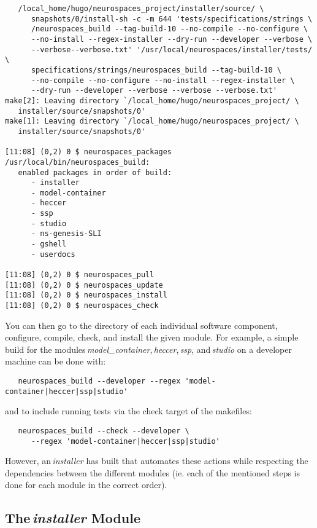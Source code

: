 \documentclass[12pt]{article}
\begin{document}
\begin{itemize}
\begin{enumerate}
\begin{verbatim}
   /local_home/hugo/neurospaces_project/installer/source/ \
      snapshots/0/install-sh -c -m 644 'tests/specifications/strings \
      /neurospaces_build --tag-build-10 --no-compile --no-configure \
      --no-install --regex-installer --dry-run --developer --verbose \
      --verbose--verbose.txt' '/usr/local/neurospaces/installer/tests/ \
      specifications/strings/neurospaces_build --tag-build-10 \
      --no-compile --no-configure --no-install --regex-installer \
      --dry-run --developer --verbose --verbose --verbose.txt'
make[2]: Leaving directory `/local_home/hugo/neurospaces_project/ \
   installer/source/snapshots/0'
make[1]: Leaving directory `/local_home/hugo/neurospaces_project/ \
   installer/source/snapshots/0'

[11:08] (0,2) 0 $ neurospaces_packages
/usr/local/bin/neurospaces_build:
   enabled packages in order of build:
      - installer
      - model-container
      - heccer
      - ssp
      - studio
      - ns-genesis-SLI
      - gshell
      - userdocs

[11:08] (0,2) 0 $ neurospaces_pull
[11:08] (0,2) 0 $ neurospaces_update
[11:08] (0,2) 0 $ neurospaces_install
[11:08] (0,2) 0 $ neurospaces_check
\end{verbatim}
\end{enumerate}
\end{itemize}

You can then go to the directory of each individual software component, configure, compile, check, and install the given module. For example, a simple build for the modules\,{\it model\_container},\,{\it heccer},\,{\it ssp}, and\,{\it studio} on a developer machine can be done with:  
\begin{verbatim}
   neurospaces_build --developer --regex 'model-container|heccer|ssp|studio'
\end{verbatim}
and to include running tests via the check target of the makefiles:
\begin{verbatim}
   neurospaces_build --check --developer \
      --regex 'model-container|heccer|ssp|studio'
\end{verbatim}
However, an\,{\it installer} has built that automates these actions while respecting the dependencies between the different modules (ie. each of the mentioned steps is done for each module in the correct order).

\subsection*{The\,{\it installer} Module}
\end{document}
